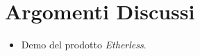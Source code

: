 \section{Argomenti Discussi}
	\begin{itemize}
		\item Demo del prodotto \textit{Etherless}.
	\end{itemize}
